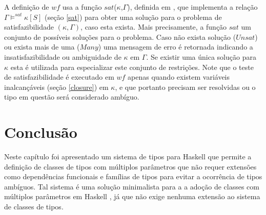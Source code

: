 A defini\c{c}\~ao de $wf$ usa a fun\c{c}\~ao $sat$($\kappa$,$\Gamma$), definida em \cite{Camarao04, Camarao07}, que 
implementa a rela\c{c}\~ao $\Gamma\models^{sat}\kappa[S]$ (se\c{c}\~ao \ref{sat}) para obter uma solu\c{c}\~ao para o
problema de satisfazibilidade $(\kappa,\Gamma)$, caso esta exista. Mais precisamente, a fun\c{c}\~ao $sat$ um conjunto
de poss\'iveis solu\c{c}\~oes para o problema. Caso n\~ao exista solu\c{c}\~ao ($Unsat$) ou exista mais de uma ($Many$)
uma mensagem de erro \'e retornada indicando a insatisfazibilidade ou ambiguidade de $\kappa$ em $\Gamma$. Se existir
uma \'unica solu\c{c}\~ao para $\kappa$ esta \'e utilizada para especializar este conjunto de restri\c{c}\~oes. Note que
o teste de satisfazibilidade \'e executado em $wf$ apenas quando existem vari\'aveis inalcan\c{c}\'aveis (se\c{c}\~ao
\ref{closure}) em $\kappa$, e que portanto precisam ser resolvidas ou o tipo em quest\~ao ser\'a considerado amb\'iguo.

\section{Conclus\~ao}

Neste cap\'itulo foi apresentado um sistema de tipos para Haskell que permite a defini\c{c}\~ao de classes de tipos
com m\'ultiplos par\^ametros que n\~ao requer extens\~oes como depend\^encias funcionais e fam\'ilias
de tipos para evitar a ocorr\^encia de tipos amb\'iguos. Tal sistema \'e uma solu\c{c}\~ao minimalista para a
a ado\c{c}\~ao de classes com m\'ultiplos par\^ametros em Haskell \cite{Camarao09}, j\'a que n\~ao exige nenhuma
extens\~ao ao sistema de classes de tipos. 

